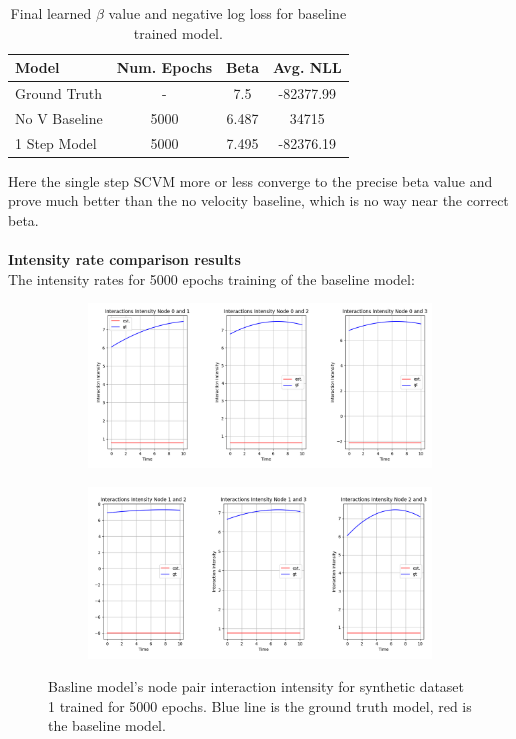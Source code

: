 \begin{table}[H]
\centering
\begin{tabular}{|l|c|cc|}
\hline
Model         & \multicolumn{1}{l|}{Num. Epochs} & Beta & Avg. NLL \\ \hline
Ground Truth  & -                                & 7.5  & -82377.99  \\
No V Baseline & 5000                             & 6.487  & 34715        \\
1 Step Model  & 5000                             & 7.495   & -82376.19      \\ \hline
\end{tabular}
\caption{Final learned $\beta$ value and negative log loss for baseline trained model.}
\label{tab:SingleStep1}
\end{table}
\noindent
Here the single step SCVM more or less converge to the precise beta value and prove much better than the no velocity baseline, which is no way near the correct beta.
\\\\
\noindent
\textbf{Intensity rate comparison results}
\\
The intensity rates for 5000 epochs training of the baseline model:
\begin{figure}[H]
    \centering
    \begin{subfigure}[b]{\textwidth}
        \centering
        \includegraphics[width=\textwidth]{0_images/rq1_baseline_intensity_plot1.png}
    \end{subfigure}
    \vfill
    \begin{subfigure}[b]{\textwidth}
        \centering
        \includegraphics[width=\textwidth]{0_images/rq1_baseline_intensity_plot2.png}
    \end{subfigure}
    \caption{Basline model's node pair interaction intensity for synthetic dataset 1 trained for 5000 epochs. Blue line is the ground truth model, red is the baseline model.}
    \label{fig:RQ1:baseline_intensity}
\end{figure}
